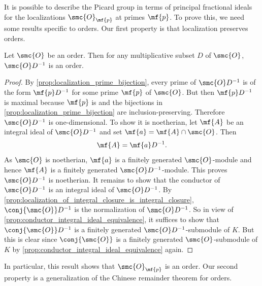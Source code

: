 \documentclass[12pt]{article}
\begin{document}
      It is possible to describe the Picard group in terms of principal fractional ideals for the localizations \(\smc{O}_{\mf{p}}\) at primes \(\mf{p}\). To prove this, we need some results specific to orders. Our first property is that localization preserves orders.

      \begin{proposition}\label{prop:localization_preserves_orders}
        Let \(\smc{O}\) be an order. Then for any multiplicative subset \(D\) of \(\smc{O}\), \(\smc{O}D^{-1}\) is an order.
      \end{proposition}
      \begin{proof}
        By \cref{prop:localization_prime_bijection}, every prime of \(\smc{O}D^{-1}\) is of the form \(\mf{p}D^{-1}\) for some prime \(\mf{p}\) of \(\smc{O}\). But then \(\mf{p}D^{-1}\) is maximal because \(\mf{p}\) is and the bijections in \cref{prop:localization_prime_bijection} are inclusion-preserving. Therefore \(\smc{O}D^{-1}\) is one-dimensional. To show it is noetherian, let \(\mf{A}\) be an integral ideal of \(\smc{O}D^{-1}\) and set \(\mf{a} = \mf{A} \cap \smc{O}\). Then
        \[
          \mf{A} = \mf{a}D^{-1}.
        \]
        As \(\smc{O}\) is noetherian, \(\mf{a}\) is a finitely generated \(\smc{O}\)-module and hence \(\mf{A}\) is a finitely generated \(\smc{O}D^{-1}\)-module. This proves \(\smc{O}D^{-1}\) is noetherian. It remains to show that the conductor of \(\smc{O}D^{-1}\) is an integral ideal of \(\smc{O}D^{-1}\). By \cref{prop:localization_of_integral_closure_is_integral_closure}, \(\conj{\smc{O}}D^{-1}\) is the normalization of \(\smc{O}D^{-1}\). So in view of \cref{prop:conductor_integral_ideal_equivalence}, it suffices to show that \(\conj{\smc{O}}D^{-1}\) is a finitely generated \(\smc{O}D^{-1}\)-submodule of \(K\). But this is clear since \(\conj{\smc{O}}\) is a finitely generated \(\smc{O}\)-submodule of \(K\) by \cref{prop:conductor_integral_ideal_equivalence} again.
      \end{proof}
      
      In particular, this result shows that \(\smc{O}_{\mf{p}}\) is an order. Our second property is a generalization of the Chinese remainder theorem for orders. 
\end{document}
